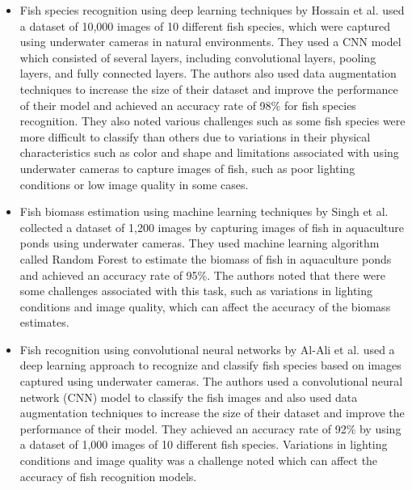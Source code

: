\begin{itemize}
    \item Fish species recognition using deep learning techniques by Hossain et al. \cite{8711657} used a dataset of 10,000 images of 10 different fish species, which were captured using underwater cameras in natural environments. They used a CNN model which consisted of several layers, including convolutional layers, pooling layers, and fully connected layers. The authors also used data augmentation techniques to increase the size of their dataset and improve the performance of their model and achieved an accuracy rate of 98\% for fish species recognition. They also noted various challenges such as some fish species were more difficult to classify than others due to variations in their physical characteristics such as color and shape and limitations associated with using underwater cameras to capture images of fish, such as poor lighting conditions or low image quality in some cases.
    \item Fish biomass estimation using machine learning techniques by Singh et al. \cite{singh2019fish} collected a dataset of 1,200 images by capturing images of fish in aquaculture ponds using underwater cameras. They used machine learning algorithm called Random Forest to estimate the biomass of fish in aquaculture ponds and achieved an accuracy rate of 95\%. The authors noted that there were some challenges associated with this task, such as variations in lighting conditions and image quality, which can affect the accuracy of the biomass estimates.
    \item Fish recognition using convolutional neural networks by Al-Ali et al. \cite{al2018fish} used a deep learning approach to recognize and classify fish species based on images captured using underwater cameras. The authors used a convolutional neural network (CNN) model to classify the fish images and also used data augmentation techniques to increase the size of their dataset and improve the performance of their model. They achieved an accuracy rate of 92\% by using a dataset of 1,000 images of 10 different fish species. Variations in lighting conditions and image quality was a challenge noted which can affect the accuracy of fish recognition models.
\end{itemize}

